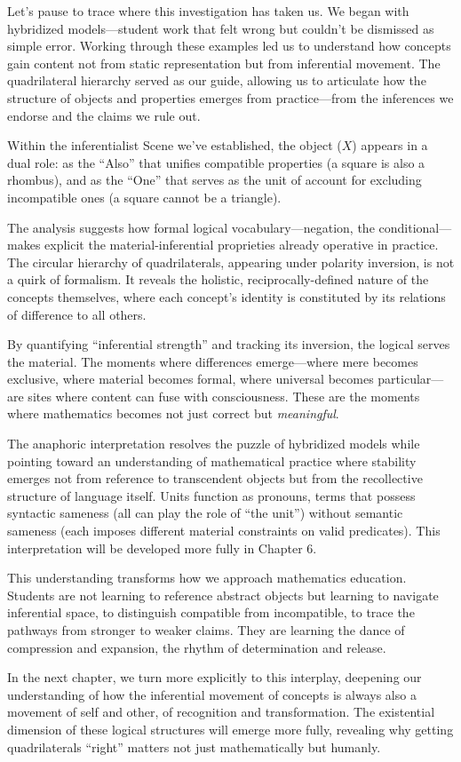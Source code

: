 \documentclass[12pt]{book}
\begin{document}
Let's pause to trace where this investigation has taken us. We began with hybridized models---student work that felt wrong but couldn't be dismissed as simple error. Working through these examples led us to understand how concepts gain content not from static representation but from inferential movement. The quadrilateral hierarchy served as our guide, allowing us to articulate how the structure of objects and properties emerges from practice---from the inferences we endorse and the claims we rule out.

Within the inferentialist Scene we've established, the object (\(X\)) appears in a dual role: as the ``Also'' that unifies compatible properties (a square is also a rhombus), and as the ``One'' that serves as the unit of account for excluding incompatible ones (a square cannot be a triangle).

The analysis suggests how formal logical vocabulary---negation, the conditional---makes explicit the material-inferential proprieties already operative in practice. The circular hierarchy of quadrilaterals, appearing under polarity inversion, is not a quirk of formalism. It reveals the holistic, reciprocally-defined nature of the concepts themselves, where each concept's identity is constituted by its relations of difference to all others.

By quantifying ``inferential strength'' and tracking its inversion, the logical serves the material. The moments where differences emerge---where mere becomes exclusive, where material becomes formal, where universal becomes particular---are sites where content can fuse with consciousness. These are the moments where mathematics becomes not just correct but \emph{meaningful}.

The anaphoric interpretation resolves the puzzle of hybridized models while pointing toward an understanding of mathematical practice where stability emerges not from reference to transcendent objects but from the recollective structure of language itself. Units function as pronouns, terms that possess syntactic sameness (all can play the role of ``the unit'') without semantic sameness (each imposes different material constraints on valid predicates). This interpretation will be developed more fully in Chapter 6.

This understanding transforms how we approach mathematics education. Students are not learning to reference abstract objects but learning to navigate inferential space, to distinguish compatible from incompatible, to trace the pathways from stronger to weaker claims. They are learning the dance of compression and expansion, the rhythm of determination and release.

In the next chapter, we turn more explicitly to this interplay, deepening our understanding of how the inferential movement of concepts is always also a movement of self and other, of recognition and transformation. The existential dimension of these logical structures will emerge more fully, revealing why getting quadrilaterals ``right'' matters not just mathematically but humanly.

\printbibliography[heading=subbibliography]
\end{document}
